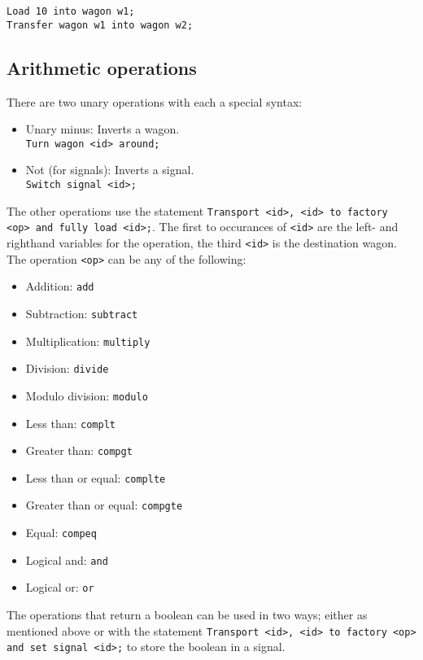 \documentclass[10pt,a4paper,notitlepage]{article}
\begin{document}
\begin{lstlisting}
Load 10 into wagon w1;
Transfer wagon w1 into wagon w2;
\end{lstlisting}

\subsection{Arithmetic operations}

There are two unary operations with each a special syntax:

\begin{itemize}
\item Unary minus: Inverts a wagon. \\ \texttt{Turn wagon <id> around;}
\item Not (for signals): Inverts a signal. \\ \texttt{Switch signal <id>;}
\end{itemize}

The other operations use the statement \texttt{Transport <id>, <id> to factory <op> and fully load <id>;}. The first to occurances of \texttt{<id>} are the left- and righthand variables for the operation, the third \texttt{<id>} is the destination wagon. The operation \texttt{<op>} can be any of the following:

\begin{itemize}
\item Addition: \texttt{add}
\item Subtraction: \texttt{subtract}
\item Multiplication: \texttt{multiply}
\item Division: \texttt{divide}
\item Modulo division: \texttt{modulo}
\item Less than: \texttt{complt}
\item Greater than: \texttt{compgt}
\item Less than or equal: \texttt{complte}
\item Greater than or equal: \texttt{compgte}
\item Equal: \texttt{compeq}
\item Logical and: \texttt{and}
\item Logical or: \texttt{or}
\end{itemize}

The operations that return a boolean can be used in two ways; either as mentioned above or with the statement \texttt{Transport <id>, <id> to factory <op> and set signal <id>;} to store the boolean in a signal.
\end{document}
